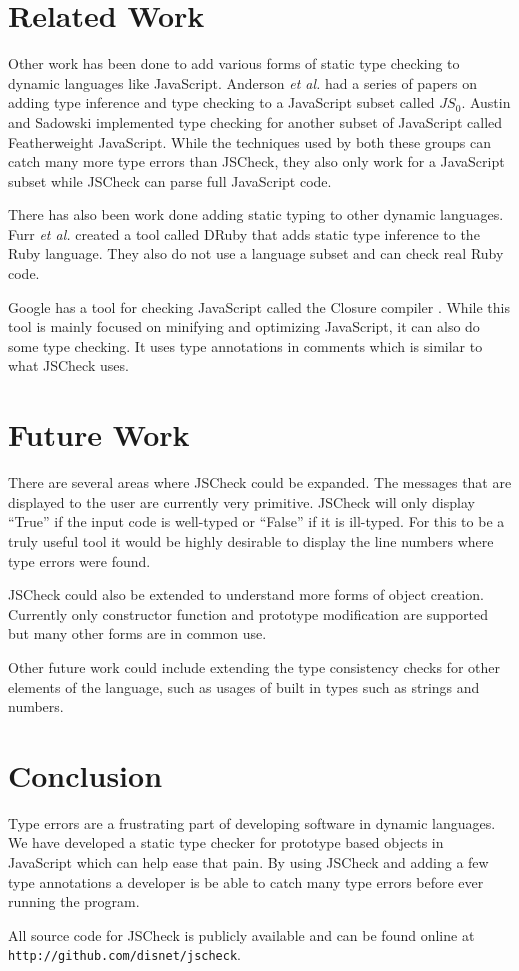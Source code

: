 \documentclass{article}
\begin{document}
\section{Related Work}
\label{sec:related}
Other work has been done to add various forms of static type checking to dynamic
languages like JavaScript. Anderson {\em et al.}
\cite{typeinferenceforjavascriptEcoop, typecheckingforjavascript} had a series of papers
on adding type inference and type checking to a JavaScript subset called $JS_0$. Austin
and Sadowski \cite{fwjsStruct} implemented type checking for another subset of JavaScript called 
Featherweight JavaScript. While the techniques used by both these groups can catch 
many more type errors than JSCheck, 
they also only work for a JavaScript subset while JSCheck can parse full JavaScript code.

There has also been work done adding static typing to other dynamic languages. Furr {\em et al.}
\cite{typecheckingruby} created a tool called DRuby that adds static type inference to
the Ruby language. They also do not use a language subset and can check real Ruby code.

Google has a tool for checking JavaScript called the Closure 
compiler \cite{closureCompiler}. While this tool is mainly focused on minifying
and optimizing JavaScript, it can also do some type checking. It uses type
annotations in comments which is similar to what JSCheck uses.

\section{Future Work}
\label{sec:future}
There are several areas where JSCheck could be expanded. The messages that are displayed
to the user are currently very primitive. JSCheck will only display ``True'' if the
input code is well-typed or ``False'' if it is ill-typed. For this to be a truly useful tool
it would be highly desirable to display the line numbers where type errors were found.

JSCheck could also be extended to understand more forms of object creation. Currently
only constructor function and prototype modification are supported but many other forms
are in common use.

Other future work could include extending the type consistency checks for other elements 
of the language, such as usages of built in types such as strings and numbers.

\section{Conclusion}
\label{sec:conclusion}
Type errors are a frustrating part of developing software in dynamic languages.
We have developed a static type checker for prototype based objects in JavaScript which
can help ease that pain.
By using JSCheck and adding a few type annotations a developer is be able to catch many
type errors before ever running the program. 

All source code for JSCheck is publicly available and can be found online at
{\tt http://github.com/disnet/jscheck}.



\end{document}
